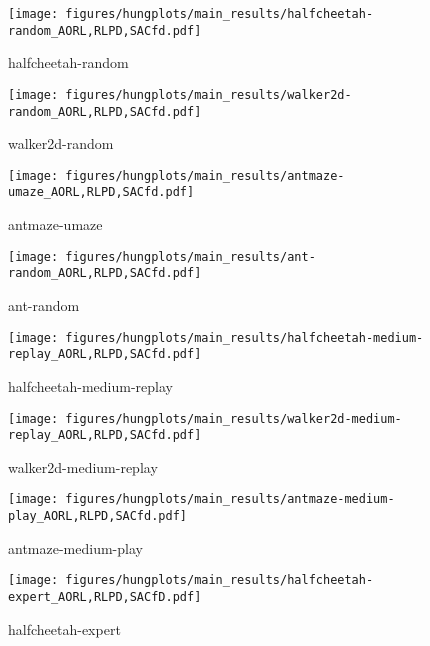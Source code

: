\renewcommand{\thesubfigure}{\alph{subfigure}}  %
\begin{figure*}[t!]

    \begin{subfigure}{.24\textwidth}
        \centering
        \texttt{[image: figures/hungplots/main\_results/halfcheetah-random\_AORL,RLPD,SACfd.pdf]}
        \caption{halfcheetah-random}\label{fig:exp:1}
    \end{subfigure}\hfil
        \begin{subfigure}{.24\textwidth}
        \centering
        \texttt{[image: figures/hungplots/main\_results/walker2d-random\_AORL,RLPD,SACfd.pdf]}
        \caption{walker2d-random}\label{fig:exp:2}
    \end{subfigure}\hfil
    \begin{subfigure}{.24\textwidth}
        \centering
        \texttt{[image: figures/hungplots/main\_results/antmaze-umaze\_AORL,RLPD,SACfd.pdf]}
        \caption{antmaze-umaze}\label{fig:exp:3}
    \end{subfigure}\hfil
    \begin{subfigure}{.24\textwidth}
        \centering
        \texttt{[image: figures/hungplots/main\_results/ant-random\_AORL,RLPD,SACfd.pdf]}
        \caption{ant-random}\label{fig:exp:4}
    \end{subfigure}\hfil

    \begin{subfigure}{.24\textwidth}
        \centering
        \texttt{[image: figures/hungplots/main\_results/halfcheetah-medium-replay\_AORL,RLPD,SACfd.pdf]}
        \caption{halfcheetah-medium-replay}\label{fig:exp:5}
    \end{subfigure}\hfil
    \begin{subfigure}{.24\textwidth}
        \centering
        \texttt{[image: figures/hungplots/main\_results/walker2d-medium-replay\_AORL,RLPD,SACfd.pdf]}
        \caption{walker2d-medium-replay}\label{fig:exp:6}
    \end{subfigure}\hfil
    \begin{subfigure}{.24\textwidth}
        \centering
        \texttt{[image: figures/hungplots/main\_results/antmaze-medium-play\_AORL,RLPD,SACfd.pdf]}
        \caption{antmaze-medium-play}\label{fig:exp:7}
    \end{subfigure}\hfil  
    \begin{subfigure}{.24\textwidth}
        \centering
        \texttt{[image: figures/hungplots/main\_results/halfcheetah-expert\_AORL,RLPD,SACfD.pdf]}
        \caption{halfcheetah-expert}\label{fig:exp:8}
    \end{subfigure}\hfil



\end{figure*}
